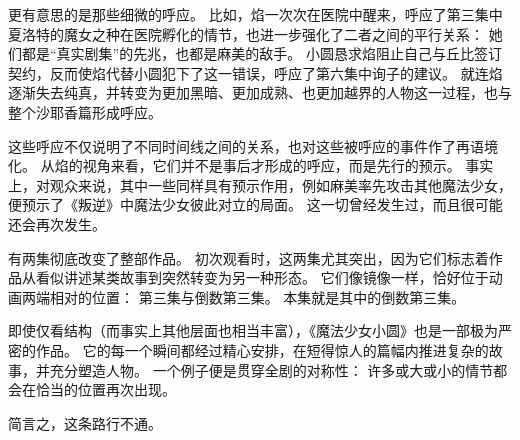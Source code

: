 更有意思的是那些细微的呼应。
比如，焰一次次在医院中醒来，呼应了第三集中夏洛特的魔女之种在医院孵化的情节，也进一步强化了二者之间的平行关系：
她们都是“真实剧集”的先兆，也都是麻美的敌手。
小圆恳求焰阻止自己与丘比签订契约，反而使焰代替小圆犯下了这一错误，呼应了第六集中询子的建议。
就连焰逐渐失去纯真，并转变为更加黑暗、更加成熟、也更加越界的人物这一过程，也与整个沙耶香篇形成呼应。

这些呼应不仅说明了不同时间线之间的关系，也对这些被呼应的事件作了再语境化。
从焰的视角来看，它们并不是事后才形成的呼应，而是先行的预示。
事实上，对观众来说，其中一些同样具有预示作用，例如麻美率先攻击其他魔法少女，便预示了《叛逆》中魔法少女彼此对立的局面。
这一切曾经发生过，而且很可能还会再次发生。

有两集彻底改变了整部作品。
初次观看时，这两集尤其突出，因为它们标志着作品从看似讲述某类故事到突然转变为另一种形态。
它们像镜像一样，恰好位于动画两端相对的位置：
第三集与倒数第三集。
本集就是其中的倒数第三集。

即使仅看结构（而事实上其他层面也相当丰富），《魔法少女小圆》也是一部极为严密的作品。
它的每一个瞬间都经过精心安排，在短得惊人的篇幅内推进复杂的故事，并充分塑造人物。
一个例子便是贯穿全剧的对称性：
许多或大或小的情节都会在恰当的位置再次出现。

简言之，这条路行不通。
